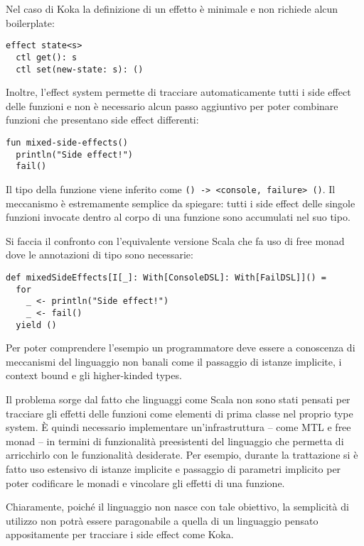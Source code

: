 Nel caso di Koka la definizione di un effetto è minimale e non richiede alcun boilerplate:
\begin{lstlisting}[language=koka]
effect state<s>
  ctl get(): s
  ctl set(new-state: s): ()
\end{lstlisting}

Inoltre, l'effect system permette di tracciare automaticamente tutti i side effect delle funzioni e non è necessario alcun passo aggiuntivo per poter combinare funzioni che presentano side effect differenti:
\begin{lstlisting}[language=koka]
fun mixed-side-effects()
  println("Side effect!")
  fail()
\end{lstlisting}
Il tipo della funzione viene inferito come \lstinline{() -> <console, failure> ()}. Il meccanismo è estremamente semplice da spiegare: tutti i side effect delle singole funzioni invocate dentro al corpo di una funzione sono accumulati nel suo tipo.

Si faccia il confronto con l'equivalente versione Scala che fa uso di free monad dove le annotazioni di tipo sono necessarie:
\begin{lstlisting}[language=scala3]
def mixedSideEffects[I[_]: With[ConsoleDSL]: With[FailDSL]]() =
  for
    _ <- println("Side effect!")
    _ <- fail()
  yield ()
\end{lstlisting}
Per poter comprendere l'esempio un programmatore deve essere a conoscenza di meccanismi del linguaggio non banali come il passaggio di istanze implicite, i context bound e gli higher-kinded types.

Il problema sorge dal fatto che linguaggi come Scala non sono stati pensati per tracciare gli effetti delle funzioni come elementi di prima classe nel proprio type system.
È quindi necessario implementare un'infrastruttura -- come MTL e free monad -- in termini di funzionalità preesistenti del linguaggio che permetta di arricchirlo con le funzionalità desiderate.
Per esempio, durante la trattazione si è fatto uso estensivo di istanze implicite e passaggio di parametri implicito per poter codificare le monadi e vincolare gli effetti di una funzione.

Chiaramente, poiché il linguaggio non nasce con tale obiettivo, la semplicità di utilizzo non potrà essere paragonabile a quella di un linguaggio pensato appositamente per tracciare i side effect come Koka.


